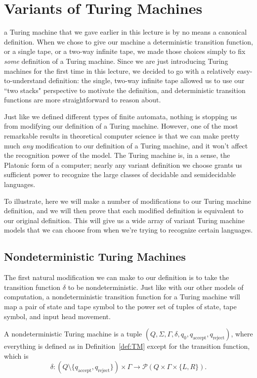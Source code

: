 \section{Variants of Turing Machines}\label{sec:variantsofturingmachines}

 a Turing machine that we gave earlier in this lecture is by no means a canonical definition. When we chose to give our machine a deterministic transition function, or a single tape, or a two-way infinite tape, we made those choices simply to fix \emph{some} definition of a Turing machine. Since we are just introducing Turing machines for the first time in this lecture, we decided to go with a relatively easy-to-understand definition: the single, two-way infinite tape allowed us to use our ``two stacks" perspective to motivate the definition, and deterministic transition functions are more straightforward to reason about.

Just like we defined different types of finite automata, nothing is stopping us from modifying our definition of a Turing machine. However, one of the most remarkable results in theoretical computer science is that we can make pretty much \emph{any} modification to our definition of a Turing machine, and it won't affect the recognition power of the model. The Turing machine is, in a sense, the Platonic form of a computer; nearly any variant definition we choose grants us sufficient power to recognize the large classes of decidable and semidecidable languages.

To illustrate, here we will make a number of modifications to our Turing machine definition, and we will then prove that each modified definition is equivalent to our original definition. This will give us a wide array of variant Turing machine models that we can choose from when we're trying to recognize certain languages.

\subsection{Nondeterministic Turing Machines}

The first natural modification we can make to our definition is to take the transition function $\delta$ to be nondeterministic. Just like with our other models of computation, a nondeterministic transition function for a Turing machine will map a pair of state and tape symbol to the power set of tuples of state, tape symbol, and input head movement.

\begin{definition}\label{def:nondeterministicTM}
\sloppy A nondeterministic Turing machine is a tuple $(Q, \Sigma, \Gamma, \delta, q_{0}, \allowbreak q_{\text{accept}}, q_{\text{reject}})$, where everything is defined as in Definition~\ref{def:TM} except for the transition function, which is
\begin{equation*}
\delta: \left( Q \setminus \{q_{\text{accept}}, q_{\text{reject}}\} \right) \times \Gamma \to \mathcal{P}\left( Q \times \Gamma \times \{L, R\} \right).
\end{equation*}
\end{definition}

